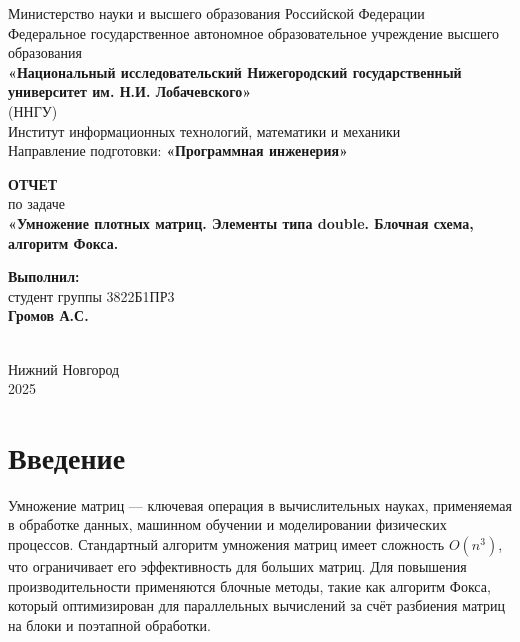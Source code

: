 \documentclass[12pt]{article}
\begin{document}
\begin{titlepage}
    \centering
    \large
    Министерство науки и высшего образования Российской Федерации\\[0.3cm]
    Федеральное государственное автономное образовательное учреждение высшего образования\\[0.3cm]
    \textbf{«Национальный исследовательский Нижегородский государственный университет им. Н.И. Лобачевского»}\\
    (ННГУ)\\[0.8cm]
    Институт информационных технологий, математики и механики\\[0.3cm]
    Направление подготовки: \textbf{«Программная инженерия»}\\[1.5cm]

    \vspace{1cm}

    {\LARGE \textbf{ОТЧЕТ}}\\[0.3cm]
    {\Large по задаче}\\[0.3cm]
    {\LARGE \textbf{«Умножение плотных матриц. Элементы типа double. Блочная схема, алгоритм Фокса.}}\\[5.0cm]

    \hfill\parbox{0.5\textwidth}{
        \textbf{Выполнил:} \\
        студент группы 3822Б1ПР3 \\
        \textbf{Громов А.С.}
    }\\[5cm]

    Нижний Новгород\\
    2025
\end{titlepage}


\thispagestyle{empty}
\clearpage
{}
\setcounter{page}{2}
\tableofcontents
\clearpage
\setcounter{page}{3}

\section{Введение}

\hspace*{1.25em}Умножение матриц — ключевая операция в вычислительных науках, применяемая в обработке данных, машинном обучении и моделировании физических процессов. Стандартный алгоритм умножения матриц имеет сложность $O(n^3)$, что ограничивает его эффективность для больших матриц. Для повышения производительности применяются блочные методы, такие как алгоритм Фокса, который оптимизирован для параллельных вычислений за счёт разбиения матриц на блоки и поэтапной обработки.
\end{document}

